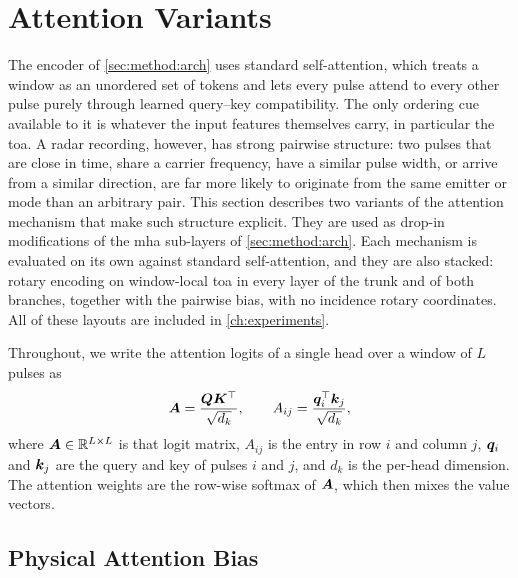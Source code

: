 \section{Attention Variants}\label{sec:method:attention}

The encoder of \cref{sec:method:arch} uses standard self-attention, which treats a window as an unordered set of tokens and lets every pulse attend to every other pulse purely through learned query--key compatibility.
The only ordering cue available to it is whatever the input features themselves carry, in particular the \gls{toa}.
A radar recording, however, has strong pairwise structure: two pulses that are close in time, share a carrier frequency, have a similar pulse width, or arrive from a similar direction, are far more likely to originate from the same emitter or mode than an arbitrary pair.
This section describes two variants of the attention mechanism that make such structure explicit.
They are used as drop-in modifications of the \gls{mha} sub-layers of \cref{sec:method:arch}.
Each mechanism is evaluated on its own against standard self-attention, and they are also stacked: rotary encoding on window-local \gls{toa} in every layer of the trunk and of both branches, together with the pairwise bias, with no incidence rotary coordinates.
All of these layouts are included in \cref{ch:experiments}.

Throughout, we write the attention logits of a single head over a window of $L$ pulses as
\begin{equation}\label{eq:method:attn_base}
  \bm{A} = \frac{\bm{Q}\bm{K}^{\top}}{\sqrt{d_k}},
  \qquad
  A_{ij} = \frac{\bm{q}_i^{\top}\bm{k}_j}{\sqrt{d_k}},
\end{equation}
where $\bm{A}\in\mathbb{R}^{L\times L}$ is that logit matrix, $A_{ij}$ is the entry in row $i$ and column $j$, $\bm{q}_i$ and $\bm{k}_j$ are the query and key of pulses $i$ and $j$, and $d_k$ is the per-head dimension.
The attention weights are the row-wise softmax of $\bm{A}$, which then mixes the value vectors.

\subsection{Physical Attention Bias}\label{sec:method:attention:bias}

